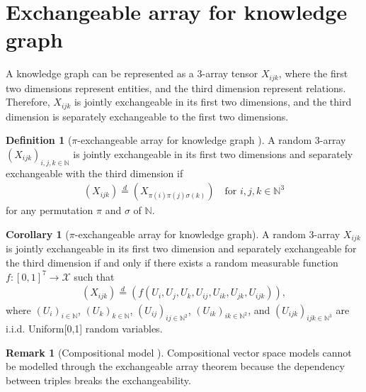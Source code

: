 \documentclass{article}
\theoremstyle{definition}
\newtheorem{definition}{Definition}
\newtheorem{remark}{Remark}
\newtheorem{corollary}{Corollary}[definition] %
\begin{document}
\section{Exchangeable array for knowledge graph}

A knowledge graph can be represented as a 3-array tensor $X_{ijk}$, where the first two dimensions represent entities, and the third dimension represent relations. Therefore, $X_{ijk}$ is jointly exchangeable in its first two dimensions, and the third dimension is separately exchangeable to the first two dimensions.

\begin{definition}[$\pi$-exchangeable array for knowledge graph \citep{Orbanz2015}]A random 3-array $(X_{ijk})_{i,j,k\in \mathbb{N}}$ is jointly exchangeable in its first two dimensions and separately exchangeable with the third dimension if
\begin{align}
(X_{ijk}) \stackrel{d}{=} (X_{\pi(i)\pi(j)\sigma(k)}) \quad \text{for } i,j,k \in \mathbb{N}^3
\end{align}
for any permutation $\pi$ and $\sigma$ of $\mathbb{N}$.
\end{definition}


\begin{corollary}[$\pi$-exchangeable array for knowledge graph]
A random 3-array $X_{ijk}$ is jointly exchangeable in its first two dimension and separately exchangeable for the third dimension if and only if there exists a random measurable function $f:[0,1]^7 \rightarrow \mathcal{X}$ such that
\begin{align}
(X_{ijk})  \stackrel{d}{=} (f(U_i, U_j, U_k, U_{ij}, U_{ik}, U_{jk}, U_{ijk})),
\end{align}
where $(U_i)_{i\in \mathbb{N}}$, $(U_k)_{k\in \mathbb{N}}$, $(U_{ij})_{ij\in \mathbb{N}^2}$, $(U_{ik})_{ik\in \mathbb{N}^2}$, and $(U_{ijk})_{ijk\in \mathbb{N}^3}$  are i.i.d. Uniform[0,1] random variables.
\end{corollary}

\begin{remark}[Compositional model \citep{gu2015traversing}] Compositional vector space models cannot be modelled through the exchangeable array theorem because the dependency between triples breaks the exchangeability.
\end{remark}
\end{document}
